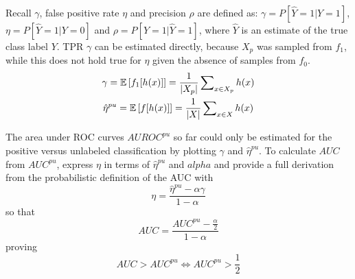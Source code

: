 Recall \(\gamma\), false positive rate \(\eta\) and precision \(\rho\) are defined as: \(\gamma = P[\hat{Y} = 1| Y = 1]\), \(\eta = P[\hat{Y} = 1| Y = 0]\) and \(\rho = P[Y = 1| \hat{Y} = 1]\), where \(\hat{Y}\) is an estimate of the true class label \(Y\). TPR \(\gamma\) can be estimated directly, because \(X_p\) was sampled from \(f_1\), while this does not hold true for \(\eta\) given the absence of samples from \(f_0\). 
\begin{gather*}
\gamma = {\mathbb E}\left[ f_1[h(x)] \right] = \frac{1}{|X_p|} \sum\nolimits_{x \in X_p} h(x) \\
\hat{\eta}^{pu} = {\mathbb E}\left[ f[h(x)] \right] = \frac{1}{|X|} \sum\nolimits_{x \in X} h(x)
\end{gather*}

The area under ROC curves \(AUROC^{pu}\) so far could only be estimated for the positive versus unlabeled classification by plotting \(\gamma\) and \(\hat{\eta}^{pu}\). To calculate \(AUC\) from \(AUC^{pu}\), \cite{jain} express \(\eta\) in terms of \(\hat{\eta}^{pu}\) and \(alpha\) and provide a full derivation from the probabilistic definition of the AUC with
\[\eta = \frac{\hat{\eta}^{pu} - \alpha \gamma}{1 - \alpha}\] so that
\[AUC = \frac{AUC^{pu} - \frac{\alpha}{2}}{1 - \alpha}\] proving
\[AUC > AUC^{pu} \iff AUC^{pu} > \frac{1}{2}\]